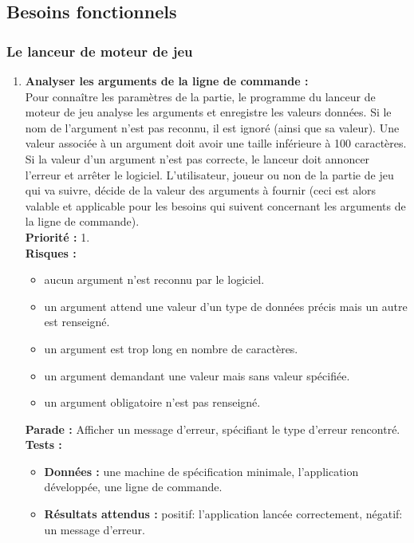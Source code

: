 \documentclass{article}
\begin{document}
\subsection{Besoins fonctionnels}

\subsubsection{Le lanceur de moteur de jeu}

\begin{enumerate}

    \item \textbf{Analyser les arguments de la ligne de commande :}\\
    Pour connaître les paramètres de la partie, le programme du lanceur de moteur de jeu analyse les arguments et enregistre les valeurs données. Si le nom de l'argument n'est pas reconnu, il est ignoré (ainsi que sa valeur). Une valeur associée à un argument doit avoir une taille inférieure à 100 caractères. Si la valeur d'un argument n'est pas correcte, le lanceur doit annoncer l'erreur et arrêter le logiciel. L'utilisateur, joueur ou non de la partie de jeu qui va suivre, décide de la valeur des arguments à fournir (ceci est alors valable et applicable pour les besoins qui suivent concernant les arguments de la ligne de commande). \\
    \textbf{Priorité :} 1. \\
    \textbf{Risques :}
    \begin{itemize}
        \item aucun argument n'est reconnu par le logiciel.
        \item un argument attend une valeur d'un type de données précis mais un autre est renseigné.
        \item un argument est trop long en nombre de caractères.
        \item un argument demandant une valeur mais sans valeur spécifiée.
        \item un argument obligatoire n'est pas renseigné.
    \end{itemize}
    \textbf{Parade :} Afficher un message d'erreur, spécifiant le type d'erreur rencontré. \\
    \textbf{Tests :}
    \begin{itemize}
        \item \textbf{Données :} une machine de spécification minimale, l'application développée, une ligne de commande.
        \item \textbf{Résultats attendus :} positif: l'application lancée correctement, négatif: un message d'erreur.

\end{itemize}
\end{enumerate}
\end{document}
